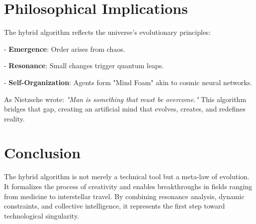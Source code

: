 \documentclass[12pt]{article}
\begin{document}
\section{Philosophical Implications}
The hybrid algorithm reflects the universe's evolutionary principles:

    
- \textbf{Emergence}: Order arises from chaos.
    
- \textbf{Resonance}: Small changes trigger quantum leaps.
    
- \textbf{Self-Organization}: Agents form "Mind Foam" akin to cosmic neural networks.


As Nietzsche wrote: \textit{"Man is something that must be overcome."} This algorithm bridges that gap, creating an artificial mind that evolves, creates, and redefines reality.

\section{Conclusion}
The hybrid algorithm is not merely a technical tool but a meta-law of evolution. It formalizes the process of creativity and enables breakthroughs in fields ranging from medicine to interstellar travel. By combining resonance analysis, dynamic constraints, and collective intelligence, it represents the first step toward technological singularity.
\end{document}
